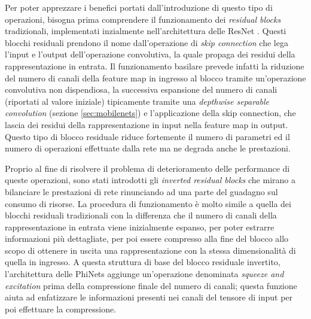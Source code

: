 Per poter apprezzare i benefici portati dall'introduzione di questo tipo di operazioni, bisogna prima comprendere il funzionamento dei \textit{residual blocks} tradizionali, implementati inzialmente nell'architettura delle ResNet \cite{ResNet}. Questi blocchi residuali prendono il nome dall'operazione di \textit{skip connection} che lega l'input e l'output dell'operazione convolutiva, la quale propaga dei residui della rappresentazione in entrata. Il funzionamento basilare prevede infatti la riduzione del numero di canali della feature map in ingresso al blocco tramite un'operazione convolutiva non dispendiosa, la successiva espansione del numero di canali (riportati al valore iniziale) tipicamente tramite una \textit{depthwise separable convolution} (sezione \ref{sec:mobilenets}) e l'applicazione della skip connection, che lascia dei residui della rappresentazione in input nella feature map in output. Questo tipo di blocco residuale riduce fortemente il numero di parametri ed il numero di operazioni effettuate dalla rete ma ne degrada anche le prestazioni. 

Proprio al fine di risolvere il problema di deterioramento delle performance di queste operazioni, sono stati introdotti gli \textit{inverted residual blocks} che mirano a bilanciare le prestazioni di rete rinunciando ad una parte del guadagno sul consumo di risorse. La procedura di funzionamento è molto simile a quella dei blocchi residuali tradizionali con la differenza che il numero di canali della rappresentazione in entrata viene inizialmente espanso, per poter estrarre informazioni più dettagliate, per poi essere compresso alla fine del blocco allo scopo di ottenere in uscita una rappresentazione con la stessa dimensionalità di quella in ingresso. A questa struttura di base del blocco residuale invertito, l'architettura delle PhiNets aggiunge un'operazione denominata \textit{squeeze and excitation} prima della compressione finale del numero di canali; questa funzione aiuta ad enfatizzare le informazioni presenti nei canali del tensore di input per poi effettuare la compressione.



